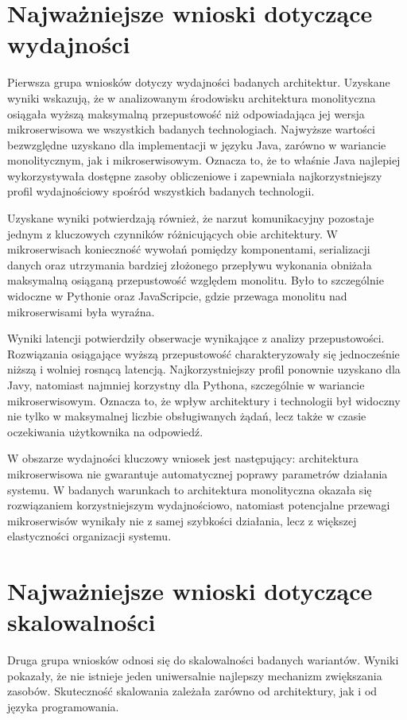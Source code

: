 \section{Najważniejsze wnioski dotyczące wydajności}

Pierwsza grupa wniosków dotyczy wydajności badanych architektur. Uzyskane wyniki wskazują, że w analizowanym środowisku architektura monolityczna osiągała wyższą maksymalną przepustowość niż odpowiadająca jej wersja mikroserwisowa we wszystkich badanych technologiach. Najwyższe wartości bezwzględne uzyskano dla implementacji w języku Java, zarówno w wariancie monolitycznym, jak i mikroserwisowym. Oznacza to, że to właśnie Java najlepiej wykorzystywała dostępne zasoby obliczeniowe i zapewniała najkorzystniejszy profil wydajnościowy spośród wszystkich badanych technologii.

Uzyskane wyniki potwierdzają również, że narzut komunikacyjny pozostaje jednym z kluczowych czynników różnicujących obie architektury. W mikroserwisach konieczność wywołań pomiędzy komponentami, serializacji danych oraz utrzymania bardziej złożonego przepływu wykonania obniżała maksymalną osiąganą przepustowość względem monolitu. Było to szczególnie widoczne w Pythonie oraz JavaScripcie, gdzie przewaga monolitu nad mikroserwisami była wyraźna.

Wyniki latencji potwierdziły obserwacje wynikające z analizy przepustowości. Rozwiązania osiągające wyższą przepustowość charakteryzowały się jednocześnie niższą i wolniej rosnącą latencją. Najkorzystniejszy profil ponownie uzyskano dla Javy, natomiast najmniej korzystny dla Pythona, szczególnie w wariancie mikroserwisowym. Oznacza to, że wpływ architektury i technologii był widoczny nie tylko w maksymalnej liczbie obsługiwanych żądań, lecz także w czasie oczekiwania użytkownika na odpowiedź.

W obszarze wydajności kluczowy wniosek jest następujący: architektura mikroserwisowa nie gwarantuje automatycznej poprawy parametrów działania systemu. W badanych warunkach to architektura monolityczna okazała się rozwiązaniem korzystniejszym wydajnościowo, natomiast potencjalne przewagi mikroserwisów wynikały nie z samej szybkości działania, lecz z większej elastyczności organizacji systemu.

\section{Najważniejsze wnioski dotyczące skalowalności}

Druga grupa wniosków odnosi się do skalowalności badanych wariantów. Wyniki pokazały, że nie istnieje jeden uniwersalnie najlepszy mechanizm zwiększania zasobów. Skuteczność skalowania zależała zarówno od architektury, jak i od języka programowania.

